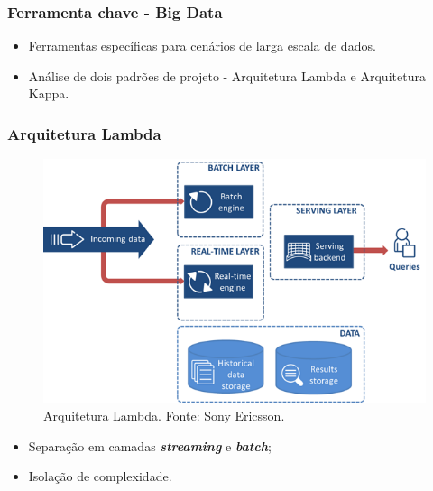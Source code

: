 \begin{frame}
    \frametitle{Ferramenta chave - Big Data}
    \begin{itemize}
        \item Ferramentas específicas para cenários de larga escala de dados.
        \item Análise de dois padrões de projeto - Arquitetura Lambda e Arquitetura Kappa.
    \end{itemize}
\end{frame}

\begin{frame}
    \frametitle{Arquitetura Lambda}
    \begin{figure}
        \includegraphics[scale=0.3]{figures/LambdaArchitecture.png}
        \caption{Arquitetura Lambda. Fonte: Sony Ericsson.}
    \end{figure}
    \begin{itemize}
        \item Separação em camadas \textbf{\textit{streaming}} e
            \textbf{\textit{batch}};
        \item Isolação de complexidade.
    \end{itemize}
\end{frame}
